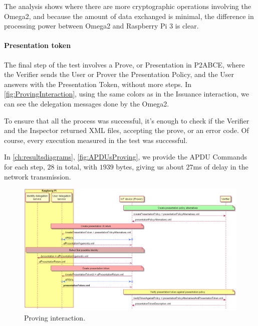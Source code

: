 The analysis shows where there are more cryptographic operations involving the Omega2, and because the amount of data exchanged is minimal, the difference in processing power between Omega2 and Raspberry Pi 3 is clear.



\paragraph{Presentation token}\hfil

The final step of the test involves a Prove, or Presentation in P2ABCE, where the Verifier sends the User or Prover the Presentation Policy, and the User answers with the Presentation Token, without more steps. In \autoref{fig:ProvingInteraction}, using the same colors as in the Issuance interaction, we can see the delegation messages done by the Omega2.

To ensure that all the process was successful, it's enough to check if the Verifier and the Inspector returned XML files, accepting the prove, or an error code. Of course, every execution measured in the test was successful.

In \autoref{ch:resultsdiagrams}, \autoref{fig:APDUsProving}, we provide the APDU Commands for each step, $28$ in total, with $1939$ bytes, giving us about $27$ms of delay in the network transmission.



\begin{figure}[bth]
	\begin{center}
		\includegraphics[width=\linewidth]{gfx/UML/ProvingInteraction}
	\end{center}
	\caption{Proving interaction.}
	\label{fig:ProvingInteraction}
\end{figure}




